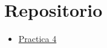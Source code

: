 \documentclass{article}
\begin{document}
%

\nocite{*}

%

\section{Repositorio}\label{sec:Repositorio}
\begin{itemize}
    \item {\color{blue}\href{https://github.com/pintovillamar/software-construction/tree/main/}{Practica 4}}
\end{itemize}
\end{document}
